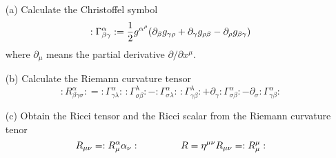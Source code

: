\begin{itemize}
\item[(a)] Calculate the Christoffel symbol
\begin{equation}
\label{christoffel_symbol}
:\Gamma ^\alpha _{\beta \gamma}: = 
\dfrac{1}{2} g^{\alpha ^\rho} \qty(
\partial_\beta g_{\gamma \rho} + 
\partial_\gamma g_{\rho \beta} -
\partial_\rho g_{\beta \gamma}
)
\end{equation}
where $\partial_\mu$ means the partial derivative $\partial/\partial x^{\mu}$.
\item[(b)] Calculate the Riemann curvature tensor
\begin{equation}
\label{riemann_tensor}
: R^\alpha _{\beta \gamma \sigma}:
=
:\Gamma ^\alpha _{\gamma \lambda}:\,
:\Gamma ^\lambda _{\sigma \beta}:
-
:\Gamma ^\alpha _{\sigma \lambda}:\,
:\Gamma ^\lambda _{\gamma \beta}:
+
\partial_\gamma :\Gamma^\alpha _{\sigma \beta}: 
-
\partial_\sigma :\Gamma^\alpha _{\gamma \beta} :
\end{equation}

\item[(c)] Obtain the Ricci tensor and the Ricci scalar from the Riemann curvature tenor
\begin{equation}
\label{ricci}
R_{\mu \nu} = :R^\alpha _\mu \alpha _\nu: \hspace{1.5cm}
R=\eta^{\mu \nu} R_{\mu \nu} = :R^{\mu} _\mu:
\end{equation}

\end{itemize}

